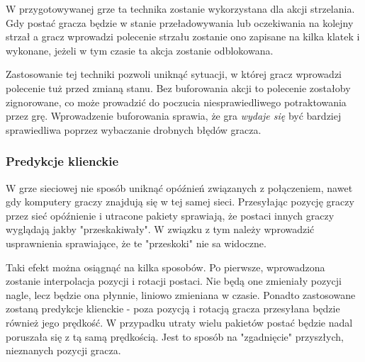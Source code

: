 W przygotowywanej grze ta technika zostanie wykorzystana dla akcji strzelania. Gdy postać gracza będzie w stanie przeładowywania lub oczekiwania na kolejny strzał a gracz wprowadzi polecenie strzału zostanie ono zapisane na kilka klatek i wykonane, jeżeli w tym czasie ta akcja zostanie odblokowana. 

Zastosowanie tej techniki pozwoli uniknąć sytuacji, w której gracz wprowadzi polecenie tuż przed zmianą stanu. Bez buforowania akcji to polecenie zostałoby zignorowane, co może prowadzić do poczucia niesprawiedliwego potraktowania przez grę. Wprowadzenie buforowania sprawia, że gra \emph{wydaje się} być bardziej sprawiedliwa poprzez wybaczanie drobnych błędów gracza.

\subsubsection*{Predykcje klienckie}\label{sec:concept_prediction}

W grze sieciowej nie sposób uniknąć opóźnień związanych z połączeniem, nawet gdy komputery graczy znajdują się w tej samej sieci. Przesyłając pozycję graczy przez sieć opóźnienie i utracone pakiety sprawiają, że postaci innych graczy wyglądają jakby "przeskakiwały". W związku z tym należy wprowadzić usprawnienia sprawiające, że te "przeskoki" nie sa widoczne. 

Taki efekt można osiągnąć na kilka sposobów. Po pierwsze, wprowadzona zostanie interpolacja pozycji i rotacji postaci. Nie będą one zmieniały pozycji nagle, lecz będzie ona płynnie, liniowo zmieniana w czasie. Ponadto zastosowane zostaną predykcje klienckie - poza pozycją i rotacją gracza przesyłana będzie również jego prędkość. W przypadku utraty wielu pakietów postać będzie nadal poruszała się z tą samą prędkością. Jest to sposób na "zgadnięcie" przyszłych, nieznanych pozycji gracza.  

